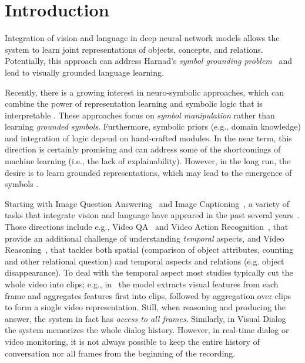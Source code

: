 \section{Introduction}

Integration of vision and language in deep neural network models allows the system to learn joint representations of objects, concepts, and relations.  Potentially, this approach can address Harnad's \textit{symbol grounding problem}~\cite{harnad2003symbol} and lead to visually grounded language learning.

Recently, there is a growing interest in neuro-symbolic approaches, which can combine the power of representation learning and symbolic logic that is interpretable \citep{mao2019neurosymbolic}. These approaches focus on \textit{symbol manipulation} rather than learning \textit{grounded symbols}.  Furthermore, symbolic priors (e.g., domain knowledge) and integration of logic depend on hand-crafted modules.  In the near term, this direction is certainly promising and can address some of the shortcomings of machine learning (i.e., the lack of explainability)\citep{vedantam2019probabilistic}.  However, in the long run, the desire is to learn grounded representations, which may lead to the emergence of symbols \citep{taniguchi2018symbol}.

Starting with Image Question Answering~\cite{malinowski2014multi,antol2015} and Image Captioning~\cite{karpathy2015deep}, a variety of tasks that integrate vision and language have appeared in the past several years~\cite{mogadala2019trends}. 
Those directions include e.g., Video QA~\cite{MovieQA} and Video Action Recognition~\cite{monfort2019moments}, that provide an additional challenge of understanding \emph{temporal} aspects, and Video Reasoning~\cite{song2018explore,yang2018dataset}, that tackles both spatial (comparison of object attributes, counting and other relational question) and temporal aspects and relations (e.g. object disappearance).
To deal with the temporal aspect most studies typically cut the whole video into clips; e.g., in~\cite{song2018explore} the model extracts visual features from each frame and aggregates features first into clips, followed by aggregation over clips to form a single video representation.
Still, when reasoning and producing the answer, the system in fact has \textit{access to all frames}. 
Similarly, in Visual Dialog~\cite{das2017visual} the system memorizes the whole dialog history.
However, in real-time dialog or video monitoring, it is not always possible to keep the entire history of conversation nor all frames from the beginning of the recording.  


